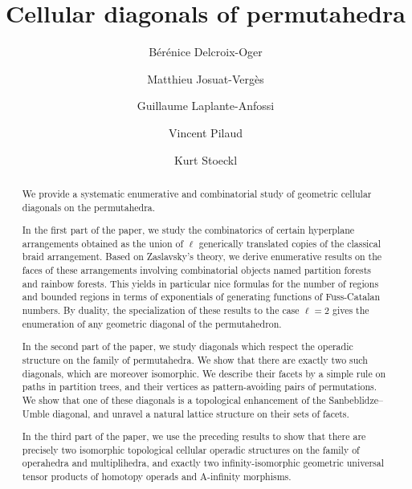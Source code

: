 \documentclass{amsart}
\title{Cellular diagonals of permutahedra}
\author[B. Delcroix-Oger]{B\'er\'enice Delcroix-Oger}
\author[M. Josuat-Verg\`es]{Matthieu Josuat-Verg\`es}
\author[G. Laplante-Anfossi]{Guillaume Laplante-Anfossi}
\author[V. Pilaud]{Vincent Pilaud}
\author[K. Stoeckl]{Kurt Stoeckl}
\newcommand{\Guillaume}[1]{\todo[color=magenta!30]{\rm #1 \\ \hfill --- G.}}
\theoremstyle{definition}
\begin{document}
\begin{abstract}
We provide a systematic enumerative and combinatorial study of geometric cellular diagonals on the permutahedra. 

In the first part of the paper, we study the combinatorics of certain hyperplane arrangements obtained as the union of $\ell$ generically translated copies of the classical braid arrangement.
Based on Zaslavsky's theory, we derive enumerative results on the faces of these arrangements involving combinatorial objects named partition forests and rainbow forests.
This yields in particular nice formulas for the number of regions and bounded regions in terms of exponentials of generating functions of Fuss-Catalan numbers.
By duality, the specialization of these results to the case $\ell = 2$ gives the enumeration of any geometric diagonal of the permutahedron.

In the second part of the paper, we study diagonals which respect the operadic structure on the family of permutahedra.
We show that there are exactly two such diagonals, which are moreover isomorphic.
We describe their facets by a simple rule on paths in partition trees, and their vertices as pattern-avoiding pairs of permutations.
We show that one of these diagonals is a topological enhancement of the Sanbeblidze--Umble diagonal, and unravel a natural lattice structure on their sets of facets.

In the third part of the paper, we use the preceding results to show that there are precisely two isomorphic topological cellular operadic structures on the family of operahedra and multiplihedra, and exactly two infinity-isomorphic geometric universal tensor products of homotopy operads and A-infinity morphisms.
\end{abstract}

\vspace*{-1.4cm}
\maketitle
\end{document}
